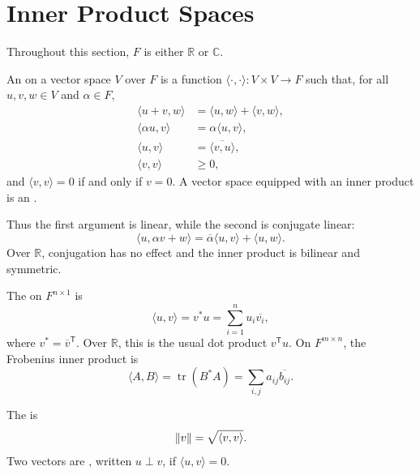 
\section{Inner Product Spaces}\label{sec:InnerProducts}

Throughout this section, $F$ is either $\mathbb R$ or $\mathbb C$.

\begin{Definition}
An  on a vector space $V$ over $F$ is a function $\langle\cdot,\cdot\rangle\colon V\times V\to F$ such that, for all $u,v,w\in V$ and $\alpha\in F$,
\begin{align*}
\langle u+v,w\rangle&=\langle u,w\rangle+\langle v,w\rangle,\\
\langle\alpha u,v\rangle&=\alpha\langle u,v\rangle,\\
\langle u,v\rangle&=\overline{\langle v,u\rangle},\\
\langle v,v\rangle&\ge0,
\end{align*}
and $\langle v,v\rangle=0$ if and only if $v=0$. A vector space equipped with an inner product is an .
\end{Definition}

Thus the first argument is linear, while the second is conjugate linear:
\begin{equation*}
\langle u,\alpha v+w\rangle=\overline\alpha\langle u,v\rangle+\langle u,w\rangle.
\end{equation*}
Over $\mathbb R$, conjugation has no effect and the inner product is bilinear and symmetric.

\begin{Example}
The  on $F^{n\times1}$ is
\begin{equation*}
\langle u,v\rangle=v^*u=\sum_{i=1}^n u_i\overline{v_i},
\end{equation*}
where $v^*=\overline v^{\mathsf T}$. Over $\mathbb R$, this is the usual dot product $v^{\mathsf T}u$. On $F^{m\times n}$, the Frobenius inner product is
\begin{equation*}
\langle A,B\rangle=\operatorname{tr}(B^*A)=\sum_{i,j}a_{ij}\overline{b_{ij}}.
\end{equation*}
\end{Example}

\begin{Definition}
The  is
\begin{equation*}
\norm{v}=\sqrt{\langle v,v\rangle}.
\end{equation*}
Two vectors are , written $u\perp v$, if $\langle u,v\rangle=0$.
\end{Definition}

